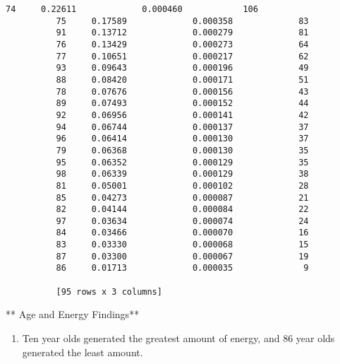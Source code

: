 \documentclass[11pt]{article}
\providecommand{\tightlist}{%
      \setlength{\itemsep}{0pt}\setlength{\parskip}{0pt}}
\begin{document}
\begin{Verbatim}[commandchars=\\\{\}]
          74     0.22611             0.000460            106
          75     0.17589             0.000358             83
          91     0.13712             0.000279             81
          76     0.13429             0.000273             64
          77     0.10651             0.000217             62
          93     0.09643             0.000196             49
          88     0.08420             0.000171             51
          78     0.07676             0.000156             43
          89     0.07493             0.000152             44
          92     0.06956             0.000141             42
          94     0.06744             0.000137             37
          96     0.06414             0.000130             37
          79     0.06368             0.000130             35
          95     0.06352             0.000129             35
          98     0.06339             0.000129             38
          81     0.05001             0.000102             28
          85     0.04273             0.000087             21
          82     0.04144             0.000084             22
          97     0.03634             0.000074             24
          84     0.03466             0.000070             16
          83     0.03330             0.000068             15
          87     0.03300             0.000067             19
          86     0.01713             0.000035              9
          
          [95 rows x 3 columns]
\end{Verbatim}
            
    ** Age and Energy Findings**

\begin{enumerate}
\def\labelenumi{\arabic{enumi})}
\tightlist
\item
  Ten year olds generated the greatest amount of energy, and 86 year
  olds generated the least amount.
\end{enumerate}


    
    
    
    
\end{document}
